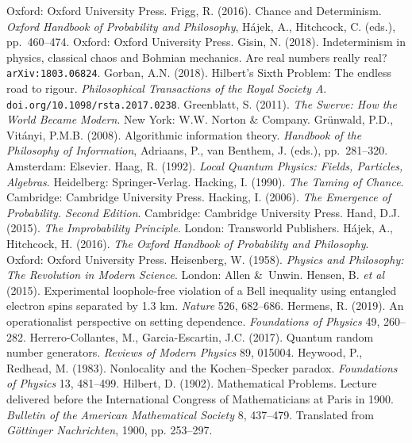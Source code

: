\documentclass[12pt]{article}
\numberwithin{equation}{section}
\begin{document}
\begin{thebibliography}{99}
Oxford: Oxford University Press.
\bibitem{} Frigg, R. (2016). Chance and Determinism. \emph{Oxford Handbook of Probability and Philosophy}, H\'{a}jek, A., Hitchcock, C. (eds.), pp.\ 460--474. Oxford: Oxford University Press. 
\bibitem{} Gisin, N. (2018). Indeterminism in physics, classical chaos and Bohmian mechanics. Are real numbers really real?
\texttt{arXiv:1803.06824}.
\bibitem{} Gorban, A.N. (2018). Hilbert's Sixth Problem: The endless road to rigour. \emph{Philosophical Transactions of the Royal Society A}. \texttt{doi.org/10.1098/rsta.2017.0238}.
\bibitem{} Greenblatt, S. (2011).
\emph{The Swerve: How the World Became Modern}. New York: W.W. Norton \& Company.
\bibitem{} Gr\"{u}nwald, P.D., Vit\'{a}nyi, P.M.B. (2008). Algorithmic information theory. 
\emph{Handbook of the Philosophy of Information}, Adriaans, P., van Benthem, J. (eds.), 
 pp.\ 281--320. Amsterdam: Elsevier. 
  \bibitem{}   Haag, R. (1992).   \emph{Local Quantum Physics: Fields, Particles, Algebras}. 
Heidelberg: Springer-Verlag.  
\bibitem{}Hacking, I. (1990). \emph{The Taming of Chance}.  Cambridge: Cambridge University Press.
\bibitem{}Hacking, I. (2006). \emph{The Emergence of Probability. Second Edition}.  Cambridge: Cambridge University Press. 
  \bibitem{}  Hand, D.J. (2015).  \emph{The Improbability Principle}. London: Transworld Publishers.
    \bibitem{} H\'{a}jek, A., Hitchcock, H. (2016). \emph{The Oxford Handbook of Probability and Philosophy}. Oxford: Oxford University Press. 
  \bibitem{} Heisenberg, W. (1958). \emph{Physics and Philosophy: The Revolution in Modern Science}. London: Allen \&\ Unwin.
  \bibitem{}Hensen, B. \emph{et al}  (2015). Experimental loophole-free violation of a Bell inequality using entangled electron spins separated by 1.3 km. \emph{Nature} 526, 682--686. 
  \bibitem{} Hermens, R. (2019).   An operationalist perspective on setting dependence.
  \emph{Foundations of Physics} 49, 260--282. 
 \bibitem{}   Herrero-Collantes, M.,  Garcia-Escartin, J.C. (2017). Quantum random number generators.
 \emph{Reviews of Modern Physics} 89, 015004. 
 \bibitem{}
 Heywood, P., Redhead, M. (1983). Nonlocality and the Kochen--Specker paradox. \emph{Foundations of Physics}
 13, 481--499.
 \bibitem{}  Hilbert, D. (1902). Mathematical Problems. Lecture delivered before the International Congress of Mathematicians at Paris in 1900. \emph{Bulletin of the American Mathematical Society} 8, 437--479. Translated from  \emph{G\"{o}ttinger Nachrichten}, 1900, pp. 253--297.

\end{thebibliography}
\end{document}
